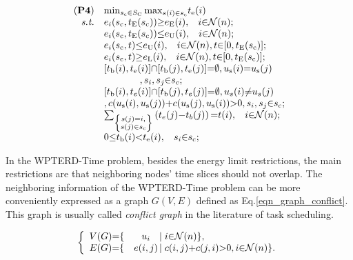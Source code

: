 \documentclass[12pt,journal,onecolumn,draftcls]{IEEEtran}
\begin{document}
\begin{equation}
\label{eqn_wpterd_time}
\begin{array}{rl}
(\textbf{P4})&\mathop{\min}_{s_\text{c}{\in}S_\text{C}}{\max}_{s(i){\in}s_\text{c}}t_\text{e}(i)\\
\textit{s.t.}&e_i(s_\text{c},t_\text{E}(s_\text{c})){\geq}e_\text{E}(i),\hspace{3mm}i{\in}\mathcal{N}(n);\\
&e_i(s_\text{c},t_\text{E}(s_\text{c})){\leq}e_\text{U}(i),\hspace{3mm}i{\in}\mathcal{N}(n);\\
&e_i(s_\text{c},t){\leq}e_\text{U}(i),\hspace{3mm}i{\in}\mathcal{N}(n),t{\in}[0,t_\text{E}(s_\text{c})];\\
&e_i(s_\text{c},t){\geq}e_\text{L}(i),\hspace{3mm}i{\in}\mathcal{N}(n),t{\in}[0,t_\text{E}(s_\text{c})];\\
&[t_\text{b}(i),t_\text{e}(i)]{\cap}[t_\text{b}(j),t_\text{e}(j)]{=}\emptyset,u_\text{s}(i){=}u_\text{s}(j)\\
&\hspace{13mm},s_i,s_j{\in}s_c;\\
&[t_\text{b}(i),t_e(i)]{\cap}[t_\text{b}(j),t_e(j)]{=}\emptyset,u_s(i){\neq}u_s(j)\\
&,c(u_\text{s}(i),u_\text{s}(j)){+}c(u_\text{s}(j),u_\text{s}(i)){>}0,s_i,s_j{\in}s_\text{c};\\
&\sum_{\left\{\substack{s(j){=}i,\\s(j){\in}s_\text{c}}\right\}}\left(t_e(j){-}t_b(j)\right){=}t(i),\hspace{3mm}i{\in}\mathcal{N}(n);\\
&0{\leq}t_\text{b}(i){<}t_\text{e}(i),\hspace{3mm}s_i{\in}s_\text{c};
\end{array}
\end{equation}

In the WPTERD-Time problem, besides the energy limit restrictions, the main restrictions are that neighboring nodes' time slices should not overlap. The neighboring information of the WPTERD-Time problem can be more conveniently expressed as a graph $G(V,E)$ defined as Eq.\eqref{eqn_graph_conflict}. This graph is usually called \textit{conflict graph} in the literature of task scheduling.

\begin{equation}
\label{eqn_graph_conflict}
\left\{
\begin{array}{lcll}
V(G){=}\{&u_i\hspace{-3mm}&|\hspace{1mm}i{\in}\mathcal{N}(n)\},\\
E(G){=}\{&e(i,j)\hspace{-3mm}&|\hspace{1mm}c(i,j){+}c(j,i){>}0,i{\in}\mathcal{N}(n)\}.\\
\end{array}
\right.
\end{equation}
\end{document}
